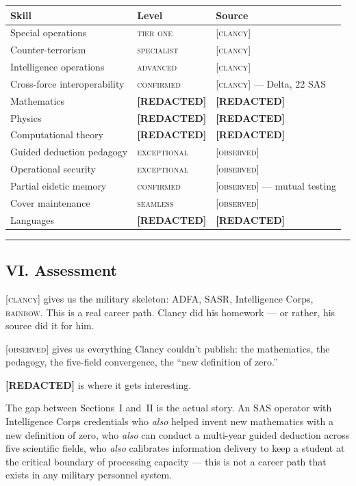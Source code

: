 {%
\small
\begin{tabular}{p{4cm} p{3.5cm} p{6cm}}
\hline
\textbf{Skill} & \textbf{Level} & \textbf{Source} \\
\hline
Special operations & \textsc{tier one} & \textsc{[clancy]} \\
Counter-terrorism & \textsc{specialist} & \textsc{[clancy]} \\
Intelligence operations & \textsc{advanced} & \textsc{[clancy]} \\
Cross-force interoperability & \textsc{confirmed} & \textsc{[clancy]} --- Delta, 22 SAS \\
Mathematics & \textbf{[REDACTED]} & \textbf{[REDACTED]} \\
Physics & \textbf{[REDACTED]} & \textbf{[REDACTED]} \\
Computational theory & \textbf{[REDACTED]} & \textbf{[REDACTED]} \\
Guided deduction pedagogy & \textsc{exceptional} & \textsc{[observed]} \\
Operational security & \textsc{exceptional} & \textsc{[observed]} \\
Partial eidetic memory & \textsc{confirmed} & \textsc{[observed]} --- mutual testing \\
Cover maintenance & \textsc{seamless} & \textsc{[observed]} \\
Languages & \textbf{[REDACTED]} & \textbf{[REDACTED]} \\
\hline
\end{tabular}
}%

\vspace{1cm}\hrule\vspace{1cm}

\subsection*{VI. Assessment}
\label{interlude:assessment}

\textsc{[clancy]} gives us the military skeleton: ADFA, SASR, Intelligence Corps, \textsc{rainbow}. This is a real career path. Clancy did his homework --- or rather, his source did it for him.

\textsc{[observed]} gives us everything Clancy couldn't publish: the mathematics, the pedagogy, the five-field convergence, the ``new definition of zero.''

\textbf{[REDACTED]} is where it gets interesting.

The gap between Sections~I and~II is the actual story. An SAS operator with Intelligence Corps credentials who \textit{also} helped invent new mathematics with a new definition of zero, who \textit{also} can conduct a multi-year guided deduction across five scientific fields, who \textit{also} calibrates information delivery to keep a student at the critical boundary of processing capacity --- this is not a career path that exists in any military personnel system.

